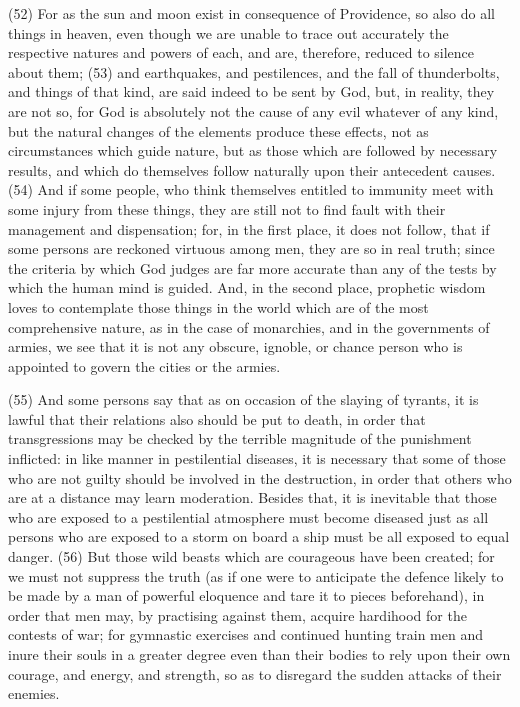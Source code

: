 (52) For as the sun and moon exist in consequence of Providence, so also do all things in heaven,
even though we are unable to trace out accurately the respective natures and powers of each, and
are, therefore, reduced to silence about them; (53) and earthquakes, and pestilences, and the fall
of thunderbolts, and things of that kind, are said indeed to be sent by God, but, in reality, they are
not so, for God is absolutely not the cause of any evil whatever of any kind, but the natural
changes of the elements produce these effects, not as circumstances which guide nature, but as
those which are followed by necessary results, and which do themselves follow naturally upon their
antecedent causes. (54) And if some people, who think themselves entitled to immunity meet with
some injury from these things, they are still not to find fault with their management and
dispensation; for, in the first place, it does not follow, that if some persons are reckoned virtuous
among men, they are so in real truth; since the criteria by which God judges are far more accurate
than any of the tests by which the human mind is guided. And, in the second place, prophetic
wisdom loves to contemplate those things in the world which are of the most comprehensive
nature, as in the case of monarchies, and in the governments of armies, we see that it is not any
obscure, ignoble, or chance person who is appointed to govern the cities or the armies.

(55) And some persons say that as on occasion of the slaying of tyrants, it is lawful that their
relations also should be put to death, in order that transgressions may be checked by the terrible
magnitude of the punishment inflicted: in like manner in pestilential diseases, it is necessary that
some of those who are not guilty should be involved in the destruction, in order that others who are
at a distance may learn moderation. Besides that, it is inevitable that those who are exposed to a
pestilential atmosphere must become diseased just as all persons who are exposed to a storm on
board a ship must be all exposed to equal danger. (56) But those wild beasts which are
courageous have been created; for we must not suppress the truth (as if one were to anticipate
the defence likely to be made by a man of powerful eloquence and tare it to pieces beforehand), in
order that men may, by practising against them, acquire hardihood for the contests of war; for
gymnastic exercises and continued hunting train men and inure their souls in a greater degree
even than their bodies to rely upon their own courage, and energy, and strength, so as to disregard
the sudden attacks of their enemies.

